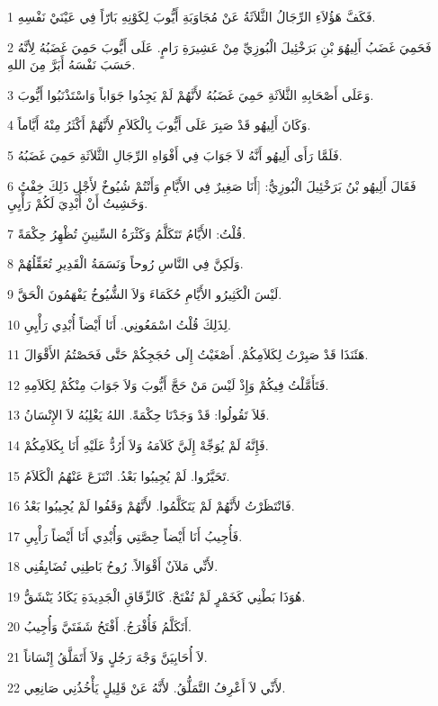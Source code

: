\par 1 فَكَفَّ هَؤُلاَءِ الرِّجَالُ الثَّلاَثَةُ عَنْ مُجَاوَبَةِ أَيُّوبَ لِكَوْنِهِ بَارّاً فِي عَيْنَيْ نَفْسِهِ.
\par 2 فَحَمِيَ غَضَبُ أَلِيهُوَ بْنِ بَرَخْئِيلَ الْبُوزِيِّ مِنْ عَشِيرَةِ رَامٍ. عَلَى أَيُّوبَ حَمِيَ غَضَبُهُ لِأنَّهُ حَسَبَ نَفْسَهُ أَبَرَّ مِنَ اللهِ.
\par 3 وَعَلَى أَصْحَابِهِ الثَّلاَثَةِ حَمِيَ غَضَبُهُ لأَنَّهُمْ لَمْ يَجِدُوا جَوَاباً وَاسْتَذْنَبُوا أَيُّوبَ.
\par 4 وَكَانَ أَلِيهُو قَدْ صَبِرَ عَلَى أَيُّوبَ بِالْكَلاَمِ لأَنَّهُمْ أَكْثَرُ مِنْهُ أَيَّاماً.
\par 5 فَلَمَّا رَأَى أَلِيهُو أَنَّهُ لاَ جَوَابَ فِي أَفْوَاهِ الرِّجَالِ الثَّلاَثَةِ حَمِيَ غَضَبُهُ.
\par 6 فَقَالَ أَلِيهُو بْنُ بَرَخْئِيلَ الْبُوزِيُّ: [أَنَا صَغِيرٌ فِي الأَيَّامِ وَأَنْتُمْ شُيُوخٌ لأَجْلِ ذَلِكَ خِفْتُ وَخَشِيتُ أَنْ أُبْدِيَ لَكُمْ رَأْيِيِ.
\par 7 قُلْتُ: الأَيَّامُ تَتَكَلَّمُ وَكَثْرَةُ السِّنِينَِ تُظْهِرُ حِكْمَةً.
\par 8 وَلَكِنَّ فِي النَّاسِ رُوحاً وَنَسَمَةُ الْقَدِيرِ تُعَقِّلُهُمْ.
\par 9 لَيْسَ الْكَثِيرُو الأَيَّامِ حُكَمَاءَ وَلاَ الشُّيُوخُ يَفْهَمُونَ الْحَقَّ.
\par 10 لِذَلِكَ قُلْتُ اسْمَعُونِي. أَنَا أَيْضاً أُبْدِي رَأْيِيِ.
\par 11 هَئَنَذَا قَدْ صَبِرْتُ لِكَلاَمِكُمْ. أَصْغَيْتُ إِلَى حُجَجِكُمْ حَتَّى فَحَصْتُمُ الأَقْوَالَ.
\par 12 فَتَأَمَّلْتُ فِيكُمْ وَإِذْ لَيْسَ مَنْ حَجَّ أَيُّوبَ وَلاَ جَوَابَ مِنْكُمْ لِكَلاَمِهِ.
\par 13 فَلاَ تَقُولُوا: قَدْ وَجَدْنَا حِكْمَةً. اللهُ يَغْلِبُهُ لاَ الإِنْسَانُ.
\par 14 فَإِنَّهُ لَمْ يُوَجِّهْ إِلَيَّ كَلاَمَهُ وَلاَ أَرُدُّ عَلَيْهِ أَنَا بِكَلاَمِكُمْ.
\par 15 تَحَيَّرُوا. لَمْ يُجِيبُوا بَعْدُ. انْتَزَعَ عَنْهُمُ الْكَلاَمُ.
\par 16 فَانْتَظَرْتُ لأَنَّهُمْ لَمْ يَتَكَلَّمُوا. لأَنَّهُمْ وَقَفُوا لَمْ يُجِيبُوا بَعْدُ.
\par 17 فَأُجِيبُ أَنَا أَيْضاً حِصَّتِي وَأُبْدِي أَنَا أَيْضاً رَأْيِيِ.
\par 18 لأَنِّي مَلآنٌ أَقْوَالاً. رُوحُ بَاطِنِي تُضَايِقُنِي.
\par 19 هُوَذَا بَطْنِي كَخَمْرٍ لَمْ تُفْتَحْ. كَالزِّقَاقِ الْجَدِيدَةِ يَكَادُ يَنْشَقُّ.
\par 20 أَتَكَلَّمُ فَأُفْرَجُ. أَفْتَحُ شَفَتَيَّ وَأُجِيبُ.
\par 21 لاَ أُحَابِيَنَّ وَجْهَ رَجُلٍ وَلاَ أَتَمَلَّقُ إِنْسَاناً.
\par 22 لأَنِّي لاَ أَعْرِفُ التَّمَلُّقُ. لأَنَّهُ عَنْ قَلِيلٍ يَأْخُذُنِي صَانِعِي.


